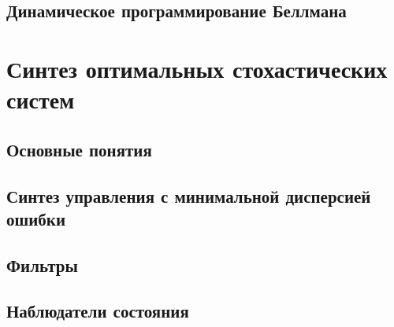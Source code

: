 \documentclass[preprint,russian,a5paper,10pt,twoside,mediummath]{ncc}
\begin{document}
 \subsection{Динамическое программирование Беллмана\label{synthesis:dyn_prog}}
  
  \clearpage
  \section{Синтез оптимальных стохастических систем\label{stochastic}}
 \subsection{Основные понятия\label{stochastic:general}}
 
 \subsection{Синтез управления с минимальной дисперсией ошибки\label{stochastic:min_error_dispersion}}
 
 \subsection{Фильтры\label{stochastic:filters}}
 
 \subsection{Наблюдатели состояния\label{stochastic:observers}}
\end{document}
